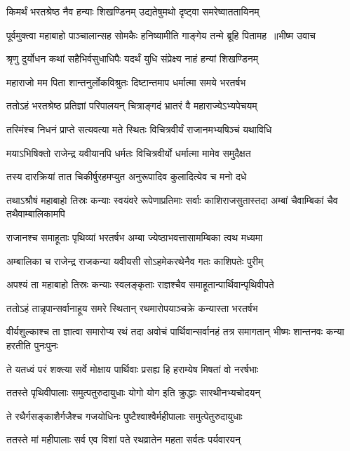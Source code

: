 \twolineshloka
{किमर्थं भरतश्रेष्ठ नैव हन्याः शिखण्डिनम्}
{उद्यतेषुमथो दृष्ट्वा समरेष्वाततायिनम्}


\threelineshloka
{पूर्वमुक्त्वा महाबाहो पाञ्चालान्सह सोमकैः}
{हनिष्यामीति गाङ्गेय तन्मे ब्रूहि पितामह ॥भीष्म उवाच}
{}


\twolineshloka
{श्रृणु दुर्योधन कथां सहैभिर्वसुधाधिपैः}
{यदर्थं युधि संप्रेक्ष्य नाहं हन्यां शिखण्डिनम्}


\twolineshloka
{महाराजो मम पिता शान्तनुर्लोकविश्रुतः}
{दिष्टान्तमाप धर्मात्मा समये भरतर्षभ}


\twolineshloka
{ततोऽहं भरतश्रेष्ठ प्रतिज्ञां परिपालयन्}
{चित्राङ्गदं भ्रातरं वै महाराज्येऽभ्यपेचयम्}


\twolineshloka
{तस्मिंश्च निधनं प्राप्ते सत्यवत्या मते स्थितः}
{विचित्रवीर्यं राजानमभ्यषिञ्चं यथाविधि}


\twolineshloka
{मयाऽभिषिक्तो राजेन्द्र यवीयानपि धर्मतः}
{विचित्रवीर्यो धर्मात्मा मामेव समुदैक्षत}


\twolineshloka
{तस्य दारक्रियां तात चिकीर्षुरहमप्युत}
{अनुरूपादिव कुलादित्येव च मनो दधे}


\threelineshloka
{तथाऽश्रौषं महाबाहो तिस्रः कन्याः स्वयंवरे}
{रूपेणाप्रतिमाः सर्वाः काशिराजसुतास्तदा}
{अम्बां चैवाम्बिकां चैव तथैवाम्बालिकामपि}


\twolineshloka
{राजानश्च समाहूताः पृथिव्यां भरतर्षभ}
{अम्बा ज्येष्ठाभवत्तासामम्बिका त्वथ मध्यमा}


\twolineshloka
{अम्बालिका च राजेन्द्र राजकन्या यवीयसी}
{सोऽहमेकरथेनैव गतः काशिपतेः पुरीम्}


\twolineshloka
{अपश्यं ता महाबाहो तिस्रः कन्याः स्वलङ्कृताः}
{राज्ञश्चैव समाहूतान्पार्थिवान्पृथिवीपते}


\twolineshloka
{ततोऽहं तान्नृपान्सर्वानाहूय समरे स्थितान्}
{रथमारोपयाञ्चक्रे कन्यास्ता भरतर्षभ}


\threelineshloka
{वीर्यशुल्काश्च ता ज्ञात्वा समारोप्य रथं तदा}
{अवोचं पार्थिवान्सर्वानहं तत्र समागतान्}
{भीष्मः शान्तनवः कन्या हरतीति पुनःपुनः}


\twolineshloka
{ते यतध्वं परं शक्त्या सर्वे मोक्षाय पार्थिवाः}
{प्रसह्य हि हराम्येष मिषतां वो नरर्षभाः}


\twolineshloka
{ततस्ते पृथिवीपालाः समुत्पतुरुदायुधाः}
{योगो योग इति क्रुद्धाः सारथीनभ्यचोदयन्}


\twolineshloka
{ते रथैर्गसङ्काशैर्गजैश्च गजयोधिनः}
{पुष्टैश्वाश्वैर्महीपालाः समुत्पेतुरुदायुधाः}


\twolineshloka
{ततस्ते मां महीपालाः सर्व एव विशां पते}
{रथव्रातेन महता सर्वतः पर्यवारयन्}


